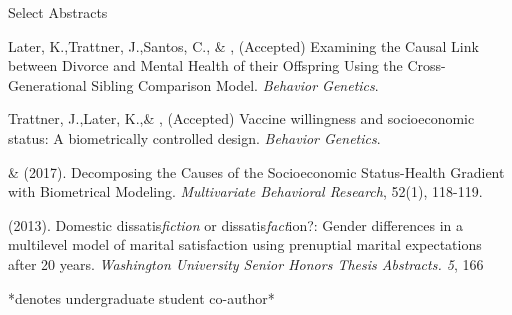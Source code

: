 \begin{rSection}{\textrm{Select Abstracts}}%
\begin{etaremune}


\item Later, K.,\nota Trattner, J.,\nota Santos, C., \& \meb, (Accepted) Examining the Causal Link between Divorce and Mental Health of their Offspring Using the Cross-Generational Sibling Comparison Model. \textit{Behavior Genetics}. 

\item Trattner, J.,\nota Later, K.,\nota \& \meb, (Accepted) Vaccine willingness and socioeconomic status: A biometrically controlled design. \textit{Behavior Genetics}. 

\item\meb \& \joe (2017). Decomposing the Causes of the Socioeconomic Status-Health Gradient with Biometrical Modeling. \textit{Multivariate Behavioral Research}, 52(1), 118-119. 

\item\meb (2013). Domestic dissatis{\em fiction} or dissatis{\em fact}ion?: Gender differences in a multilevel model of marital satisfaction using prenuptial marital expectations after 20 years. {\em Washington University Senior Honors Thesis Abstracts. 5}, 166

\vspace{-2mm}\begin{center}\footnotesize{*denotes undergraduate student co-author*}\end{center} \vspace{-3mm}
\end{etaremune}
\end{rSection}